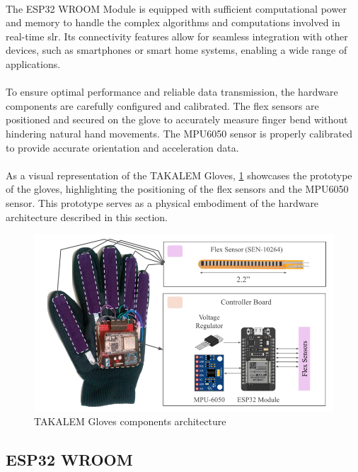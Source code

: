 \paragraph{}
The ESP32 WROOM Module is equipped with sufficient computational power and memory to handle the complex algorithms and computations involved in real-time \ac{slr}. Its connectivity features allow for seamless integration with other devices, such as smartphones or smart home systems, enabling a wide range of applications.
\paragraph{}
To ensure optimal performance and reliable data transmission, the hardware components are carefully configured and calibrated. The flex sensors are positioned and secured on the glove to accurately measure finger bend without hindering natural hand movements. The MPU6050 sensor is properly calibrated to provide accurate orientation and acceleration data.
\paragraph{}
As a visual representation of the TAKALEM Gloves, \ref{fig:prototype} showcases the prototype of the gloves, highlighting the positioning of the flex sensors and the MPU6050 sensor. This prototype serves as a physical embodiment of the hardware architecture described in this section.
\begin{figure}[h]
	\centering
	\includegraphics[width=0.8\linewidth]{images/prototype}
	\caption{TAKALEM Gloves components architecture}
	\label{fig:prototype}
\end{figure}
\subsection{ESP32 WROOM}
